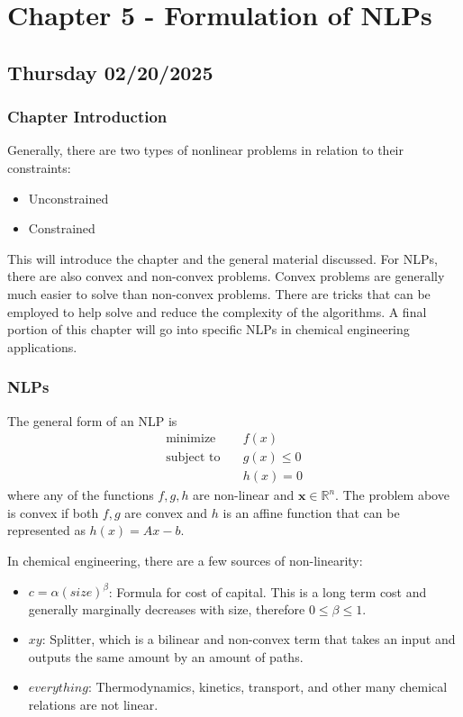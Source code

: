 \section{Chapter 5 - Formulation of NLPs}
\subsection{Thursday 02/20/2025}
\subsubsection{Chapter Introduction}
Generally, there are two types of nonlinear problems in relation to their constraints:
\begin{itemize}
    \item Unconstrained
    \item Constrained
\end{itemize}
This will introduce the chapter and the general material discussed. 
For NLPs, there are also convex and non-convex problems.
Convex problems are generally much easier to solve than non-convex problems.
There are tricks that can be employed to help solve and reduce the complexity of the algorithms.
A final portion of this chapter will go into specific NLPs in chemical engineering applications.

\subsubsection{NLPs}
The general form of an NLP is 
\begin{align}
  \text{minimize} & \quad f(x) \\
  \text{subject to} & \quad g(x) \leq 0 \\
  & \quad h(x) = 0
\end{align}
where any of the functions $f, g, h$ are non-linear and $\textbf{x} \in \mathbb{R}^n$.
The problem above is convex if both $f, g$ are convex and $h$ is an affine function that can be represented as $h(x)=Ax-b$.

In chemical engineering, there are a few sources of non-linearity:
\begin{itemize}
    \item $c = \alpha (size)^\beta $: Formula for cost of capital. This is a long term cost and generally marginally decreases with size, therefore $0 \leq \beta \leq 1$.
    \item $xy$: Splitter, which is a bilinear and non-convex term that takes an input and outputs the same amount by an amount of paths.
    \item $everything$: Thermodynamics, kinetics, transport, and other many chemical relations are not linear.
\end{itemize}

